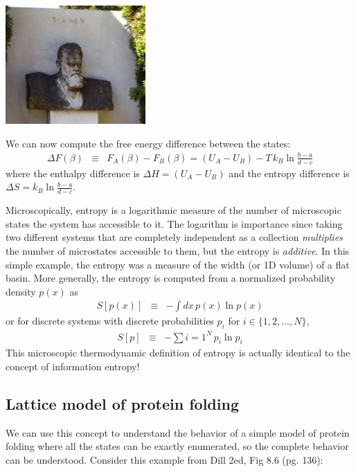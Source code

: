 \documentclass[english,course]{lecture}
\begin{document}
\begin{centering}
\includegraphics[width=0.4\textwidth]{figures/boltzmann-gravestone.JPG}

\end{centering}

We can now compute the free energy difference between the states:
\begin{eqnarray}
\Delta F(\beta) &\equiv& F_A(\beta) - F_B(\beta) = (U_A - U_B) - T \, k_B \ln \frac{b-a}{d-c}
\end{eqnarray}
where the enthalpy difference is $\Delta H = (U_A - U_B)$ and the entropy difference is $\Delta S = k_B \ln \frac{b-a}{d-c}$.

Microscopically, entropy is a logarithmic measure of the number of microscopic states the system has accessible to it. 
The logarithm is importance since taking two different systems that are completely independent as a collection \emph{multiplies} the number of microstates accessible to them, but the entropy is \emph{additive}.
In this simple example, the entropy was a measure of the width (or 1D volume) of a flat basin.
More generally, the entropy is computed from a normalized probability density $p(x)$ as
\begin{eqnarray}
S[p(x)] &\equiv& - \int dx \, p(x) \ln p(x)
\end{eqnarray}
or for discrete systems with discrete probabilities $p_i$ for $i \in \{1, 2, \ldots, N \}$,
\begin{eqnarray}
S[p] &\equiv& - \sum{i=1}^N \, p_i \ln p_i
\end{eqnarray}
This microscopic thermodynamic definition of entropy is actually identical to the concept of information entropy!

\subsection{Lattice model of protein folding}

We can use this concept to understand the behavior of a simple model of protein folding where all the states can be exactly enumerated, so the complete behavior can be understood.
Consider this example from Dill 2ed, Fig 8.6 (pg. 136):
\end{document}
